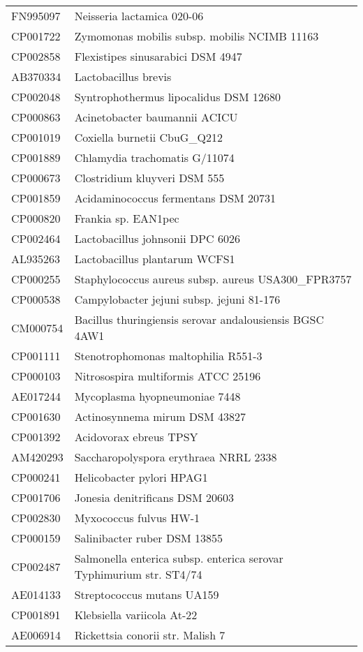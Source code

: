 \begin{longtable}{ll}
FN995097 & Neisseria lactamica 020-06\\
CP001722 & Zymomonas mobilis subsp. mobilis NCIMB 11163\\
CP002858 & Flexistipes sinusarabici DSM 4947\\
AB370334 & Lactobacillus brevis\\
CP002048 & Syntrophothermus lipocalidus DSM 12680\\
CP000863 & Acinetobacter baumannii ACICU\\
CP001019 & Coxiella burnetii CbuG_Q212\\
CP001889 & Chlamydia trachomatis G/11074\\
CP000673 & Clostridium kluyveri DSM 555\\
CP001859 & Acidaminococcus fermentans DSM 20731\\
CP000820 & Frankia sp. EAN1pec\\
CP002464 & Lactobacillus johnsonii DPC 6026\\
AL935263 & Lactobacillus plantarum WCFS1\\
CP000255 & Staphylococcus aureus subsp. aureus USA300_FPR3757\\
CP000538 & Campylobacter jejuni subsp. jejuni 81-176\\
CM000754 & Bacillus thuringiensis serovar andalousiensis BGSC 4AW1\\
CP001111 & Stenotrophomonas maltophilia R551-3\\
CP000103 & Nitrosospira multiformis ATCC 25196\\
AE017244 & Mycoplasma hyopneumoniae 7448\\
CP001630 & Actinosynnema mirum DSM 43827\\
CP001392 & Acidovorax ebreus TPSY\\
AM420293 & Saccharopolyspora erythraea NRRL 2338\\
CP000241 & Helicobacter pylori HPAG1\\
CP001706 & Jonesia denitrificans DSM 20603\\
CP002830 & Myxococcus fulvus HW-1\\
CP000159 & Salinibacter ruber DSM 13855\\
CP002487 & Salmonella enterica subsp. enterica serovar Typhimurium str. ST4/74\\
AE014133 & Streptococcus mutans UA159\\
CP001891 & Klebsiella variicola At-22\\
AE006914 & Rickettsia conorii str. Malish 7\\

\end{longtable}
